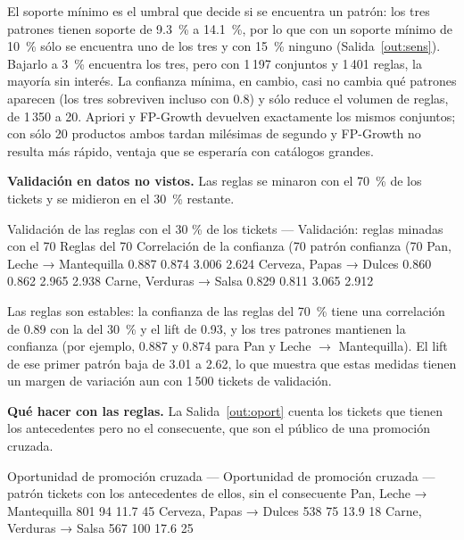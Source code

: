 \documentclass[11pt,letterpaper]{article}
\begin{document}
El soporte mínimo es el umbral que decide si se encuentra un patrón: los tres patrones tienen soporte de 9.3~\% a 14.1~\%, por lo que con un soporte mínimo de 10~\% sólo se encuentra uno de los tres y con 15~\% ninguno (Salida~\ref{out:sens}). Bajarlo a 3~\% encuentra los tres, pero con 1\,197 conjuntos y 1\,401 reglas, la mayoría sin interés. La confianza mínima, en cambio, casi no cambia qué patrones aparecen (los tres sobreviven incluso con 0.8) y sólo reduce el volumen de reglas, de 1\,350 a 20. Apriori y FP-Growth devuelven exactamente los mismos conjuntos; con sólo 20 productos ambos tardan milésimas de segundo y FP-Growth no resulta más rápido, ventaja que se esperaría con catálogos grandes.

\textbf{Validación en datos no vistos.} Las reglas se minaron con el 70~\% de los tickets y se midieron en el 30~\% restante.

\begin{consola}[label=out:val]{Validación de las reglas con el 30 \% de los tickets}
--- Validación: reglas minadas con el 70 %
Reglas del 70 %
Correlación de la confianza (70 %
                  patrón  confianza (70 %
Pan, Leche → Mantequilla             0.887             0.874        3.006        2.624
 Cerveza, Papas → Dulces             0.860             0.862        2.965        2.938
 Carne, Verduras → Salsa             0.829             0.811        3.065        2.912
\end{consola}

Las reglas son estables: la confianza de las reglas del 70~\% tiene una correlación de 0.89 con la del 30~\% y el lift de 0.93, y los tres patrones mantienen la confianza (por ejemplo, 0.887 y 0.874 para Pan y Leche $\rightarrow$ Mantequilla). El lift de ese primer patrón baja de 3.01 a 2.62, lo que muestra que estas medidas tienen un margen de variación aun con 1\,500 tickets de validación.

\textbf{Qué hacer con las reglas.} La Salida~\ref{out:oport} cuenta los tickets que tienen los antecedentes pero no el consecuente, que son el público de una promoción cruzada.

\begin{consola}[label=out:oport]{Oportunidad de promoción cruzada}
--- Oportunidad de promoción cruzada ---
                  patrón  tickets con los antecedentes  de ellos, sin el consecuente  %
Pan, Leche → Mantequilla                           801                            94               11.7                                    45
 Cerveza, Papas → Dulces                           538                            75               13.9                                    18
 Carne, Verduras → Salsa                           567                           100               17.6                                    25
\end{consola}
\end{document}
